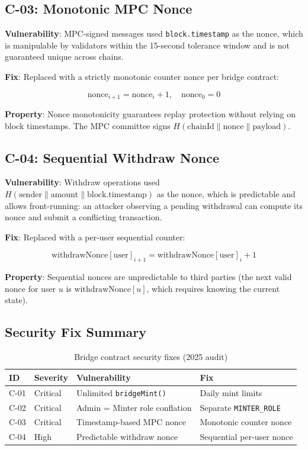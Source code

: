 \documentclass[11pt]{article}
\begin{document}
\subsection{C-03: Monotonic MPC Nonce}

\textbf{Vulnerability}: MPC-signed messages used \texttt{block.timestamp} as the nonce, which is manipulable by validators within the 15-second tolerance window and is not guaranteed unique across chains.

\textbf{Fix}: Replaced with a strictly monotonic counter nonce per bridge contract:

\begin{equation}
\text{nonce}_{i+1} = \text{nonce}_i + 1, \quad \text{nonce}_0 = 0
\end{equation}

\textbf{Property}: Nonce monotonicity guarantees replay protection without relying on block timestamps. The MPC committee signs $H(\text{chainId} \| \text{nonce} \| \text{payload})$.

\subsection{C-04: Sequential Withdraw Nonce}

\textbf{Vulnerability}: Withdraw operations used $H(\text{sender} \| \text{amount} \| \text{block.timestamp})$ as the nonce, which is predictable and allows front-running: an attacker observing a pending withdrawal can compute its nonce and submit a conflicting transaction.

\textbf{Fix}: Replaced with a per-user sequential counter:

\begin{equation}
\text{withdrawNonce}[\text{user}]_{i+1} = \text{withdrawNonce}[\text{user}]_i + 1
\end{equation}

\textbf{Property}: Sequential nonces are unpredictable to third parties (the next valid nonce for user $u$ is $\text{withdrawNonce}[u]$, which requires knowing the current state).

\subsection{Security Fix Summary}

\begin{table}[h]
\centering
\begin{tabular}{llll}
\toprule
\textbf{ID} & \textbf{Severity} & \textbf{Vulnerability} & \textbf{Fix} \\
\midrule
C-01 & Critical & Unlimited \texttt{bridgeMint()} & Daily mint limits \\
C-02 & Critical & Admin = Minter role conflation & Separate \texttt{MINTER\_ROLE} \\
C-03 & Critical & Timestamp-based MPC nonce & Monotonic counter nonce \\
C-04 & High & Predictable withdraw nonce & Sequential per-user nonce \\
\bottomrule
\end{tabular}
\caption{Bridge contract security fixes (2025 audit)}
\label{tab:security-fixes}
\end{table}
\end{document}
